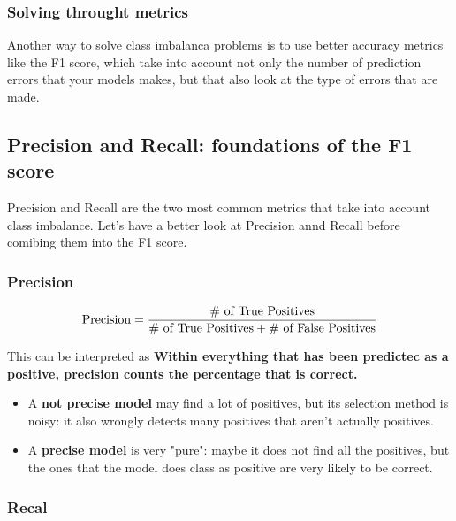 \hypertarget{solving-throught-metrics}{%
\subsubsection{Solving throught
metrics}\label{solving-throught-metrics}}

Another way to solve class imbalanca problems is to use better accuracy
metrics like the F1 score, which take into account not only the number
of prediction errors that your models makes, but that also look at the
type of errors that are made.

\hypertarget{precision-and-recall-foundations-of-the-f1-score}{%
\subsection{Precision and Recall: foundations of the F1
score}\label{precision-and-recall-foundations-of-the-f1-score}}

Precision and Recall are the two most common metrics that take into
account class imbalance. Let's have a better look at Precision annd
Recall before comibing them into the F1 score.

\hypertarget{precision}{%
\subsubsection{Precision}\label{precision}}

\begin{align*}
\textnormal{Precision} = \frac{\# \textnormal{ of  True Positives}}{\# \textnormal{ of True Positives} + \# \textnormal{ of False Positives}}
\end{align*}

This can be interpreted as \textbf{Within everything that has been
predictec as a positive, precision counts the percentage that is
correct.}

\begin{itemize}
\item
  A \textbf{not precise model} may find a lot of positives, but its
  selection method is noisy: it also wrongly detects many positives that
  aren't actually positives.
\item
  A \textbf{precise model} is very "pure": maybe it does not find all
  the positives, but the ones that the model does class as positive are
  very likely to be correct.
\end{itemize}

\hypertarget{recal}{%
\subsubsection{Recal}\label{recal}}

